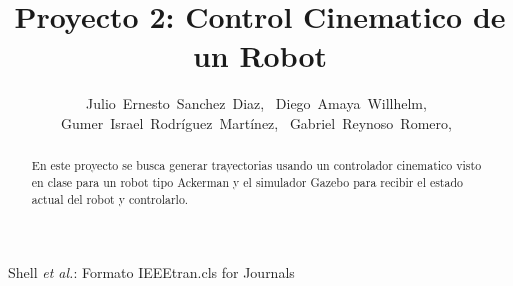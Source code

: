 \documentclass[journal]{IEEEtran}
\begin{document}
%
\title{Proyecto 2: Control Cinematico de un Robot}
%
%
%

\author{Julio~Ernesto~Sanchez~Diaz,~
        Diego~Amaya~Willhelm,~
        Gumer~Israel~Rodríguez~Martínez,~
        Gabriel~Reynoso~Romero,~
        }%

%
{Shell \MakeLowercase{\textit{et al.}}: Formato IEEEtran.cls for Journals}
% 











\maketitle


\begin{abstract}
En este proyecto se busca generar trayectorias usando un controlador cinematico visto en clase para un robot tipo Ackerman y el simulador Gazebo para recibir el estado actual del robot y controlarlo. 
\end{abstract}
\end{document}

